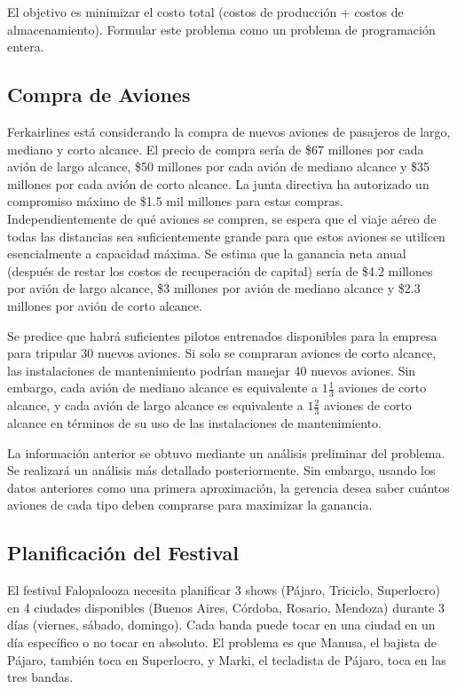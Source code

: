 \documentclass[12pt]{article}
\begin{document}
El objetivo es minimizar el costo total (costos de producción + costos de almacenamiento). Formular este problema como un problema de programación entera.

\subsection{Compra de Aviones}
Ferkairlines está considerando la compra de nuevos aviones de pasajeros de largo, mediano y corto alcance. El precio de compra sería de \$67 millones por cada avión de largo alcance, \$50 millones por cada avión de mediano alcance y \$35 millones por cada avión de corto alcance. La junta directiva ha autorizado un compromiso máximo de \$1.5 mil millones para estas compras. Independientemente de qué aviones se compren, se espera que el viaje aéreo de todas las distancias sea suficientemente grande para que estos aviones se utilicen esencialmente a capacidad máxima. Se estima que la ganancia neta anual (después de restar los costos de recuperación de capital) sería de \$4.2 millones por avión de largo alcance, \$3 millones por avión de mediano alcance y \$2.3 millones por avión de corto alcance.

\vspace{0.5em}

Se predice que habrá suficientes pilotos entrenados disponibles para la empresa para tripular 30 nuevos aviones. Si solo se compraran aviones de corto alcance, las instalaciones de mantenimiento podrían manejar 40 nuevos aviones. Sin embargo, cada avión de mediano alcance es equivalente a $1\frac{1}{3}$ aviones de corto alcance, y cada avión de largo alcance es equivalente a $1\frac{2}{3}$ aviones de corto alcance en términos de su uso de las instalaciones de mantenimiento.

\vspace{0.5em}

La información anterior se obtuvo mediante un análisis preliminar del problema. Se realizará un análisis más detallado posteriormente. Sin embargo, usando los datos anteriores como una primera aproximación, la gerencia desea saber cuántos aviones de cada tipo deben comprarse para maximizar la ganancia.

\subsection{Planificación del Festival}
El festival Falopalooza necesita planificar 3 shows (Pájaro, Triciclo, Superlocro) en 4 ciudades disponibles (Buenos Aires, Córdoba, Rosario, Mendoza) durante 3 días (viernes, sábado, domingo). Cada banda puede tocar en una ciudad en un día específico o no tocar en absoluto. El problema es que Manusa, el bajista de Pájaro, también toca en Superlocro, y Marki, el tecladista de Pájaro, toca en las tres bandas.
\end{document}
